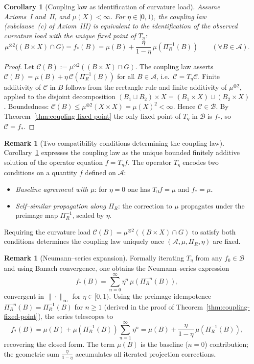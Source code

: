 \documentclass[11pt]{article}
\numberwithin{equation}{section}
\newtheorem{corollary}[theorem]{Corollary}
\theoremstyle{definition}
\newtheorem{remark}[theorem]{Remark}
\begin{document}
\begin{corollary}[Coupling law as identification of curvature load]\label{cor:coupling-identification}
Assume Axioms~I and~II, and $\mu(X)<\infty$. For $\eta\in[0,1)$, the coupling law (subclause~(c) of Axiom~III) is equivalent to the identification of the observed curvature load with the unique fixed point of $T_\eta$:
\[
\mu^{\otimes2}\bigl((B\times X)\cap G\bigr)=f_*(B)=\mu(B)+\frac{\eta}{1-\eta}\,\mu(\Pi_R^{-1}(B))
\qquad(\forall B\in\mathcal A).
\]
\end{corollary}

\begin{proof}
Let $\mathcal C(B):=\mu^{\otimes2}((B\times X)\cap G)$. The coupling law asserts $\mathcal C(B)=\mu(B)+\eta\,\mathcal C(\Pi_R^{-1}(B))$ for all $B\in\mathcal A$, i.e.\ $\mathcal C=T_\eta\mathcal C$. Finite additivity of $\mathcal C$ in $B$ follows from the rectangle rule and finite additivity of $\mu^{\otimes2}$, applied to the disjoint decomposition $(B_1\sqcup B_2)\times X=(B_1\times X)\sqcup(B_2\times X)$. Boundedness: $\mathcal C(B)\le\mu^{\otimes2}(X\times X)=\mu(X)^2<\infty$. Hence $\mathcal C\in\mathcal B$. By Theorem~\ref{thm:coupling-fixed-point} the only fixed point of $T_\eta$ in $\mathcal B$ is $f_*$, so $\mathcal C=f_*$.
\end{proof}

\begin{remark}[Two compatibility conditions determining the coupling law]\label{rem:coupling-not-ad-hoc}
Corollary~\ref{cor:coupling-identification} expresses the coupling law as the unique bounded finitely additive solution of the operator equation $f=T_\eta f$. The operator $T_\eta$ encodes two conditions on a quantity $f$ defined on $\mathcal A$:
\begin{itemize}[nosep]
\item \emph{Baseline agreement with $\mu$}: for $\eta=0$ one has $T_0 f=\mu$ and $f_*=\mu$.
\item \emph{Self--similar propagation along $\Pi_R$}: the correction to $\mu$ propagates under the preimage map $\Pi_R^{-1}$, scaled by $\eta$.
\end{itemize}
Requiring the curvature load $\mathcal C(B)=\mu^{\otimes2}((B\times X)\cap G)$ to satisfy both conditions determines the coupling law uniquely once $(\mathcal A,\mu,\Pi_R,\eta)$ are fixed.
\end{remark}

\begin{remark}[Neumann--series expansion]\label{rem:neumann}
Formally iterating $T_\eta$ from any $f_0\in\mathcal B$ and using Banach convergence, one obtains the Neumann--series expression
\[
f_*(B)=\sum_{n=0}^{\infty}\eta^n\,\mu(\Pi_R^{-n}(B)),
\]
convergent in $\|\cdot\|_\infty$ for $\eta\in[0,1)$. Using the preimage idempotence $\Pi_R^{-n}(B)=\Pi_R^{-1}(B)$ for $n\ge 1$ (derived in the proof of Theorem~\ref{thm:coupling-fixed-point}), the series telescopes to
\[
f_*(B)=\mu(B)+\mu(\Pi_R^{-1}(B))\sum_{n=1}^{\infty}\eta^n=\mu(B)+\frac{\eta}{1-\eta}\,\mu(\Pi_R^{-1}(B)),
\]
recovering the closed form. The term $\mu(B)$ is the baseline ($n=0$) contribution; the geometric sum $\tfrac{\eta}{1-\eta}$ accumulates all iterated projection corrections.
\end{remark}
\end{document}
